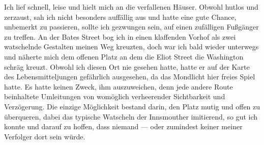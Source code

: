 Ich lief schnell, leise und hielt mich an die verfallenen Häuser. Obwohl hutlos und zerzaust, sah ich nicht besonders auffällig aus und hatte eine gute Chance, unbemerkt zu passieren, sollte ich gezwungen sein, auf einen zufälligen Fußgänger zu treffen. An der Bates Street bog ich in einen klaffenden Vorhof als zwei watschelnde Gestalten meinen Weg kreuzten, doch war ich bald wieder unterwegs und näherte mich dem offenen Platz an dem die Eliot Street die Washington schräg kreuzt. Obwohl ich diesen Ort nie gesehen hatte, hatte er auf der Karte des Lebensmitteljungen gefährlich ausgesehen, da das Mondlicht hier freies Spiel hatte. Es hatte keinen Zweck, ihm auszuweichen, denn jede andere Route beinhaltete Umleitungen von womöglich verheerender Sichtbarkeit und Verzögerung. Die einzige Möglichkeit bestand darin, den Platz mutig und offen zu überqueren, dabei das typische Watscheln der Innsmouther imitierend, so gut ich konnte und darauf zu hoffen, dass niemand --- oder zumindest keiner meiner Verfolger dort sein würde.
